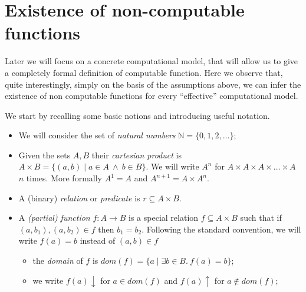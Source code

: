 \documentclass{amsbook}
\newcommand{\nat}{\ensuremath{\mathbb{N}}}
\newcommand{\dom}[1]{\ensuremath{\mathit{dom}({#1})}}
\theoremstyle{definition}
\theoremstyle{remark}
\numberwithin{section}{chapter}
\numberwithin{equation}{chapter}
\begin{document}
\section{Existence of non-computable functions}

Later we will focus on a concrete computational model, that will allow
us to give a completely formal definition of computable function. Here
we observe that, quite interestingly, simply on the basis of the
assumptions above, we can infer the existence of non computable
functions for every ``effective'' computational model.

We start by recalling some basic notions and introducing useful
notation.

\begin{itemize}
\item We will consider the set of \emph{natural numbers}
  $\nat = \{ 0, 1, 2, \dots \}$;

\item Given the sets $A, B$ their \emph{cartesian product} is
  $A \times B = \{ (a,b) \mid a \in A\ \land\ b \in B\}$. We will
  write $A^n$ for $A \times A \times A \times \ldots \times A$ $n$
  times. More formally $A^1 = A$ and $ A^{n+1} = A \times A^n$.
  
\item A (binary) \emph{relation} or \emph{predicate} is
  $r \subseteq A \times B$.
  
\item A \emph{(partial) function} $f : A \to B$ is a special relation $f \subseteq A\times B$ such that if $(a, b_1), (a, b_2) \in f$ then  $b_1 = b_2$.  Following the standard convention, we will write $f(a) = b$ instead
  of $(a, b)\in f$
  \begin{itemize}
  \item the \emph{domain} of $f$ is
    $\dom{f} = \{a \mid \exists b \in B.\ f(a) = b \}$;

  \item we write $f(a) \downarrow$ for $a \in dom (f)$ and
    $f(a) \uparrow$ for $a \not\in dom (f)$;
  \end{itemize}


\end{itemize}
\end{document}
